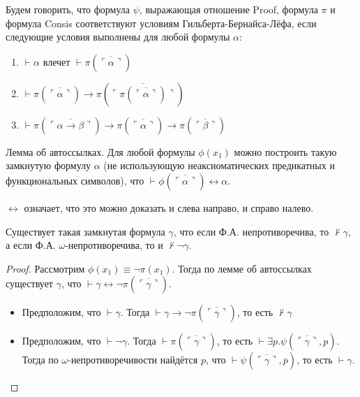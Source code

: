 \begin{definition}
Будем говорить, что формула $\psi$, выражающая отношение Proof,
формула $\pi$ и формула Consis соответствуют
условиям Гильберта-Бернайса-Лёфа, если следующие условия выполнены для любой формулы $\alpha$:

\begin{enumerate}
\item $\vdash \alpha$ влечет $\vdash \pi(\overline{\ulcorner\alpha\urcorner})$
\item $\vdash \pi (\overline{\ulcorner\alpha\urcorner}) \rightarrow \pi(\overline{\ulcorner\pi(\overline{\ulcorner\alpha\urcorner})\urcorner})$
\item $\vdash \pi (\overline{\ulcorner\alpha\rightarrow \beta\urcorner}) \rightarrow \pi(\overline{\ulcorner\alpha\urcorner}) \rightarrow \pi(\overline{\ulcorner\beta\urcorner})$
\end{enumerate}
\end{definition}

\begin{lemma}
    Лемма об автоссылках. Для любой формулы $\phi(x_1)$ можно построить такую замкнутую формулу $\alpha$ (не использующую неаксиоматических предикатных и функциональных символов), что $\vdash \phi(\overline{\ulcorner\alpha\urcorner}) \leftrightarrow \alpha$.
\end{lemma}

\begin{note}
    $\leftrightarrow$ означает, что это можно доказать и слева направо, и справо налево.
\end{note}

\begin{theorem}
    Существует такая замкнутая формула $\gamma$, что если Ф.А. непротиворечива, то
$\not\vdash \gamma$, а если Ф.А. $\omega$-непротиворечива, то и $\not\vdash\neg\gamma$.
\end{theorem}
\begin{proof}
Рассмотрим $\phi(x_1) \equiv \neg\pi(x_1)$. Тогда по лемме об автоссылках существует
$\gamma$, что $\vdash \gamma \leftrightarrow \neg\pi(\overline{\ulcorner\gamma\urcorner})$.

\begin{itemize}
\item Предположим, что $\vdash \gamma$. Тогда $\vdash \gamma \rightarrow \neg\pi(\overline{\ulcorner\gamma\urcorner})$, то есть $\not\vdash\gamma$
\item Предположим, что $\vdash \neg\gamma$. Тогда $\vdash \pi(\overline{\ulcorner\gamma\urcorner})$,
то есть $\vdash \exists p.\psi(\overline{\ulcorner\gamma\urcorner},p)$. Тогда по $\omega$-непротиворечивости
найдётся $p$, что $\vdash \psi(\overline{\ulcorner\gamma\urcorner},\overline{p})$, то есть $\vdash \gamma$.
\end{itemize}
\end{proof}

